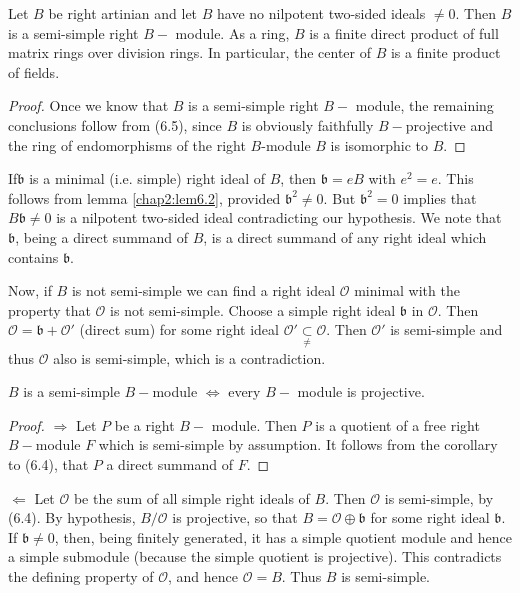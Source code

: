 \begin{prop}%
Let $B$ be right artinian and let $B$ have no nilpotent two-sided
ideals $\neq 0$. Then $B$ is a semi-simple right $B-$ module. As a
ring, $B$ is a finite direct product of full matrix rings over
division rings. In particular, the center of $B$ is a finite product
of fields. 
\end{prop}

\begin{proof}
Once we know that $B$ is a semi-simple right $B-$ module, the
remaining conclusions follow from (6.5), since $B$ is obviously
faithfully $B-$projective and the ring of endomorphisms of the right
$B$-module $B$ is isomorphic to $B$. 
\end{proof}

If\pageoriginale $\mathfrak{b}$ is a minimal (i.e. simple) right ideal
of $B$, then $\mathfrak{b} = eB$ with $e^2 = e$. This follows from
lemma \ref{chap2:lem6.2}, provided $\mathfrak{b}^2 \neq 0$. But
$\mathfrak{b}^2 = 0$ 
implies that $B \mathfrak{b} \neq 0$ is a nilpotent two-sided ideal
contradicting our hypothesis. We note that $\mathfrak{b}$, being a
direct summand of $B$, is a direct summand of any right ideal which
contains $\mathfrak{b}$. 

Now, if $B$ is not semi-simple we can find a right ideal $\mathscr{O}$
minimal with the property that $\mathscr{O}$ is not
semi-simple. Choose a simple right ideal $\mathfrak{b}$ in
$\mathscr{O}$. Then $\mathscr{O} = \mathfrak{b} + \mathscr{O'}$
(direct sum) for some right ideal $\mathscr{O'} \underset{\neq}\subset
\mathscr{O}$. Then $\mathscr{O}'$ is semi-simple and thus
$\mathscr{O}$ also is semi-simple, which is a contradiction. 

\begin{prop}\label{chap2:prop6.7}%
$B$ is a semi-simple $B-$module $\Leftrightarrow$ every $B-$ module is 
  projective. 
\end{prop}

\begin{proof}
$\Rightarrow$ Let $P$ be a right $B-$ module. Then $P$ is a quotient 
  of a free right $B- $module $F$ which is semi-simple by
  assumption. It follows from the corollary to (6.4), that $P$ a
  direct summand of $F$. 
\end{proof}

$\Leftarrow$ Let $\mathscr{O}$ be the sum of all simple right ideals
of $B$. Then $\mathscr{O}$ is semi-simple, by (6.4). By hypothesis,
$B/\mathscr{O}$ is projective, so that $B= \mathscr{O} \oplus
\mathfrak{b}$ for some right ideal $\mathfrak{b}$. If $\mathfrak{b}
\neq 0$, then, being finitely generated, it has a simple quotient
module and hence a simple submodule (because the simple quotient is
projective). This contradicts the defining property of $\mathscr{O}$,
and hence $\mathscr{O} = B$. Thus $B$ is semi-simple. 

